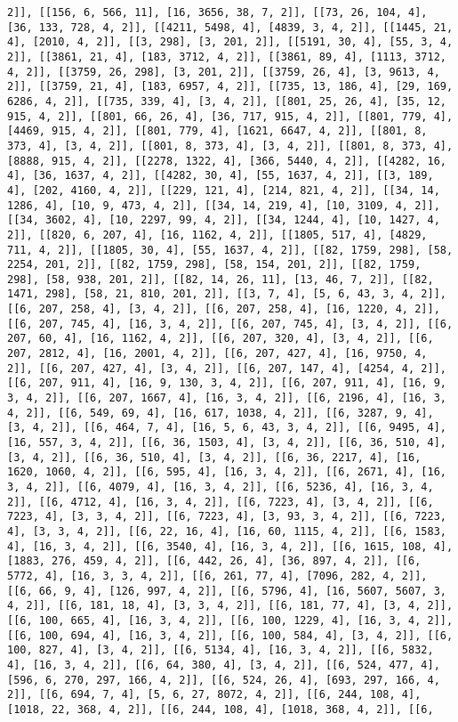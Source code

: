 \documentclass[12pt,fleqn]{article}\usepackage{../../common}
\begin{document}
\begin{verbatim}
2]], [[156, 6, 566, 11], [16, 3656, 38, 7, 2]], [[73, 26, 104, 4], [36, 133, 728, 4, 2]], [[4211, 5498, 4], [4839, 3, 4, 2]], [[1445, 21, 4], [2010, 4, 2]], [[3, 298], [3, 201, 2]], [[5191, 30, 4], [55, 3, 4, 2]], [[3861, 21, 4], [183, 3712, 4, 2]], [[3861, 89, 4], [1113, 3712, 4, 2]], [[3759, 26, 298], [3, 201, 2]], [[3759, 26, 4], [3, 9613, 4, 2]], [[3759, 21, 4], [183, 6957, 4, 2]], [[735, 13, 186, 4], [29, 169, 6286, 4, 2]], [[735, 339, 4], [3, 4, 2]], [[801, 25, 26, 4], [35, 12, 915, 4, 2]], [[801, 66, 26, 4], [36, 717, 915, 4, 2]], [[801, 779, 4], [4469, 915, 4, 2]], [[801, 779, 4], [1621, 6647, 4, 2]], [[801, 8, 373, 4], [3, 4, 2]], [[801, 8, 373, 4], [3, 4, 2]], [[801, 8, 373, 4], [8888, 915, 4, 2]], [[2278, 1322, 4], [366, 5440, 4, 2]], [[4282, 16, 4], [36, 1637, 4, 2]], [[4282, 30, 4], [55, 1637, 4, 2]], [[3, 189, 4], [202, 4160, 4, 2]], [[229, 121, 4], [214, 821, 4, 2]], [[34, 14, 1286, 4], [10, 9, 473, 4, 2]], [[34, 14, 219, 4], [10, 3109, 4, 2]], [[34, 3602, 4], [10, 2297, 99, 4, 2]], [[34, 1244, 4], [10, 1427, 4, 2]], [[820, 6, 207, 4], [16, 1162, 4, 2]], [[1805, 517, 4], [4829, 711, 4, 2]], [[1805, 30, 4], [55, 1637, 4, 2]], [[82, 1759, 298], [58, 2254, 201, 2]], [[82, 1759, 298], [58, 154, 201, 2]], [[82, 1759, 298], [58, 938, 201, 2]], [[82, 14, 26, 11], [13, 46, 7, 2]], [[82, 1471, 298], [58, 21, 810, 201, 2]], [[3, 7, 4], [5, 6, 43, 3, 4, 2]], [[6, 207, 258, 4], [3, 4, 2]], [[6, 207, 258, 4], [16, 1220, 4, 2]], [[6, 207, 745, 4], [16, 3, 4, 2]], [[6, 207, 745, 4], [3, 4, 2]], [[6, 207, 60, 4], [16, 1162, 4, 2]], [[6, 207, 320, 4], [3, 4, 2]], [[6, 207, 2812, 4], [16, 2001, 4, 2]], [[6, 207, 427, 4], [16, 9750, 4, 2]], [[6, 207, 427, 4], [3, 4, 2]], [[6, 207, 147, 4], [4254, 4, 2]], [[6, 207, 911, 4], [16, 9, 130, 3, 4, 2]], [[6, 207, 911, 4], [16, 9, 3, 4, 2]], [[6, 207, 1667, 4], [16, 3, 4, 2]], [[6, 2196, 4], [16, 3, 4, 2]], [[6, 549, 69, 4], [16, 617, 1038, 4, 2]], [[6, 3287, 9, 4], [3, 4, 2]], [[6, 464, 7, 4], [16, 5, 6, 43, 3, 4, 2]], [[6, 9495, 4], [16, 557, 3, 4, 2]], [[6, 36, 1503, 4], [3, 4, 2]], [[6, 36, 510, 4], [3, 4, 2]], [[6, 36, 510, 4], [3, 4, 2]], [[6, 36, 2217, 4], [16, 1620, 1060, 4, 2]], [[6, 595, 4], [16, 3, 4, 2]], [[6, 2671, 4], [16, 3, 4, 2]], [[6, 4079, 4], [16, 3, 4, 2]], [[6, 5236, 4], [16, 3, 4, 2]], [[6, 4712, 4], [16, 3, 4, 2]], [[6, 7223, 4], [3, 4, 2]], [[6, 7223, 4], [3, 3, 4, 2]], [[6, 7223, 4], [3, 93, 3, 4, 2]], [[6, 7223, 4], [3, 3, 4, 2]], [[6, 22, 16, 4], [16, 60, 1115, 4, 2]], [[6, 1583, 4], [16, 3, 4, 2]], [[6, 3540, 4], [16, 3, 4, 2]], [[6, 1615, 108, 4], [1883, 276, 459, 4, 2]], [[6, 442, 26, 4], [36, 897, 4, 2]], [[6, 5772, 4], [16, 3, 3, 4, 2]], [[6, 261, 77, 4], [7096, 282, 4, 2]], [[6, 66, 9, 4], [126, 997, 4, 2]], [[6, 5796, 4], [16, 5607, 5607, 3, 4, 2]], [[6, 181, 18, 4], [3, 3, 4, 2]], [[6, 181, 77, 4], [3, 4, 2]], [[6, 100, 665, 4], [16, 3, 4, 2]], [[6, 100, 1229, 4], [16, 3, 4, 2]], [[6, 100, 694, 4], [16, 3, 4, 2]], [[6, 100, 584, 4], [3, 4, 2]], [[6, 100, 827, 4], [3, 4, 2]], [[6, 5134, 4], [16, 3, 4, 2]], [[6, 5832, 4], [16, 3, 4, 2]], [[6, 64, 380, 4], [3, 4, 2]], [[6, 524, 477, 4], [596, 6, 270, 297, 166, 4, 2]], [[6, 524, 26, 4], [693, 297, 166, 4, 2]], [[6, 694, 7, 4], [5, 6, 27, 8072, 4, 2]], [[6, 244, 108, 4], [1018, 22, 368, 4, 2]], [[6, 244, 108, 4], [1018, 368, 4, 2]], [[6, 
\end{verbatim}
\end{document}
